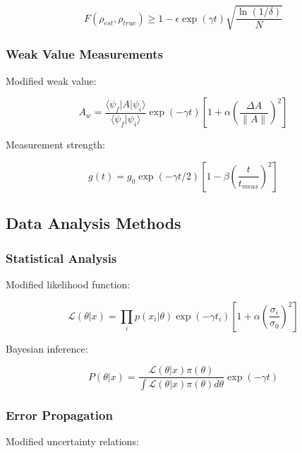\documentclass[12pt]{article}
\theoremstyle{plain}
\theoremstyle{definition}
\theoremstyle{remark}
\begin{document}
\begin{equation}
F(\rho_{est},\rho_{true}) \geq 1 - \epsilon\exp(\gamma t)\sqrt{\frac{\ln(1/\delta)}{N}}
\end{equation}

\subsubsection{Weak Value Measurements}

Modified weak value:

\begin{equation}
A_w = \frac{\langle\psi_f|A|\psi_i\rangle}{\langle\psi_f|\psi_i\rangle}\exp(-\gamma t)\left[1 + \alpha\left(\frac{\Delta A}{\|A\|}\right)^2\right]
\end{equation}

Measurement strength:

\begin{equation}
g(t) = g_0\exp(-\gamma t/2)\left[1 - \beta\left(\frac{t}{t_{meas}}\right)^2\right]
\end{equation}

\subsection{Data Analysis Methods}

\subsubsection{Statistical Analysis}

Modified likelihood function:

\begin{equation}
\mathcal{L}(\theta|x) = \prod_i p(x_i|\theta)\exp(-\gamma t_i)\left[1 + \alpha\left(\frac{\sigma_i}{\sigma_0}\right)^2\right]
\end{equation}

Bayesian inference:

\begin{equation}
P(\theta|x) = \frac{\mathcal{L}(\theta|x)\pi(\theta)}{\int \mathcal{L}(\theta|x)\pi(\theta)d\theta}\exp(-\gamma t)
\end{equation}

\subsubsection{Error Propagation}

Modified uncertainty relations:
\end{document}
